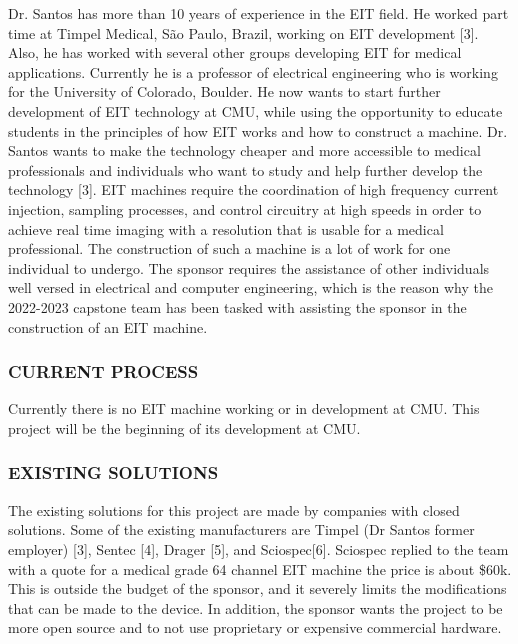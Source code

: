 Dr. Santos has more than 10 years of experience in the EIT field. He
worked part time at Timpel Medical, São Paulo, Brazil, working on EIT
development {[}3{]}. Also, he has worked with several other groups
developing EIT for medical applications. Currently he is a professor of
electrical engineering who is working for the University of Colorado,
Boulder. He now wants to start further development of EIT technology at
CMU, while using the opportunity to educate students in the principles
of how EIT works and how to construct a machine. Dr. Santos wants to
make the technology cheaper and more accessible to medical professionals
and individuals who want to study and help further develop the
technology {[}3{]}. EIT machines require the coordination of high
frequency current injection, sampling processes, and control circuitry
at high speeds in order to achieve real time imaging with a resolution
that is usable for a medical professional. The construction of such a
machine is a lot of work for one individual to undergo. The sponsor
requires the assistance of other individuals well versed in electrical
and computer engineering, which is the reason why the 2022-2023 capstone
team has been tasked with assisting the sponsor in the construction of
an EIT machine.

\subsubsection{CURRENT PROCESS}\label{current-process}

Currently there is no EIT machine working or in development at CMU. This
project will be the beginning of its development at CMU.

\subsubsection{EXISTING SOLUTIONS}\label{existing-solutions}

The existing solutions for this project are made by companies with
closed solutions. Some of the existing manufacturers are Timpel (Dr
Santos\textquotesingle{} former employer) {[}3{]}, Sentec {[}4{]},
Drager {[}5{]}, and Sciospec{[}6{]}. Sciospec replied to the team with a
quote for a medical grade 64 channel EIT machine the price is about
\$60k. This is outside the budget of the sponsor, and it severely limits
the modifications that can be made to the device. In addition, the
sponsor wants the project to be more open source and to not use
proprietary or expensive commercial hardware.

